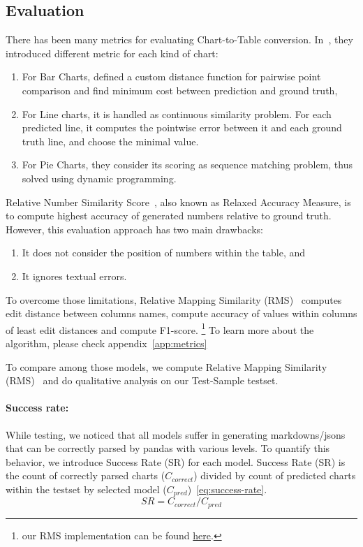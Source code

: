 \documentclass[
	letterpaper, %
]{jdf}
\begin{document}
\subsection{Evaluation}\label{ssect:evaluation}
There has been many metrics for evaluating Chart-to-Table conversion.
In~\cite{luo2021chartocr}, they introduced different metric for each kind of chart:
\begin{enumerate}
         \item For Bar Charts, defined a custom distance function for pairwise point comparison and find minimum cost between prediction and ground truth,
         \item For Line charts, it is handled as continuous similarity problem.
             For each predicted line, it computes the pointwise error between it and each ground truth line, and choose the minimal value.
         \item For Pie Charts, they consider its scoring as sequence matching problem, thus solved using dynamic programming.
              \end{enumerate}
Relative Number Similarity Score~\cite{masry2022chartqa}, also known as Relaxed Accuracy Measure, is to compute highest accuracy of generated numbers relative to ground truth.
However, this evaluation approach has two main drawbacks:
\begin{enumerate}
         \item It does not consider the position of numbers within the table, and
         \item It ignores textual errors.
              \end{enumerate}
To overcome those limitations, Relative Mapping Similarity (RMS)~\cite{liu2022deplot} computes edit distance between columns names, compute accuracy of values within columns of least edit distances and compute F1-score.
\footnote{our RMS implementation can be found \href{https://github.gatech.edu/mfayed8/GIE-metrics}{here}.}
To learn more about the algorithm, please check appendix~\ref{app:metrics}

To compare among those models, we compute Relative Mapping Similarity (RMS)~\cite{liu2022deplot} and do qualitative analysis on our Test-Sample testset.

\paragraph{Success rate:}
While testing, we noticed that all models suffer in generating markdowns/jsons that can be correctly parsed by pandas with various levels.
To quantify this behavior, we introduce Success Rate (SR) for each model.
Success Rate (SR) is the count of correctly parsed charts ($C_{correct}$) divided by count of predicted charts within the testset by selected model ($C_{pred}$)~\ref{eq:success-rate}.
\begin{equation}
    SR = C_{correct} / C_{pred}
     \label{eq:success-rate}
      \end{equation}
\end{document}
